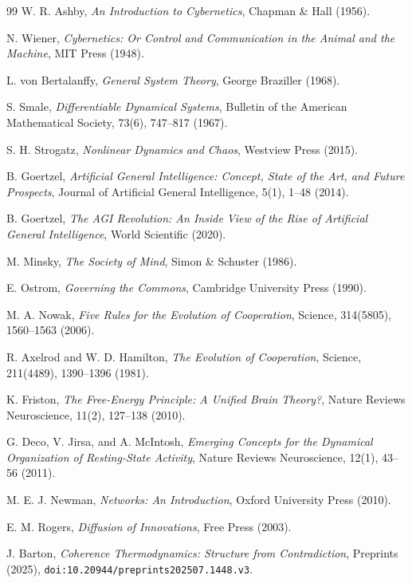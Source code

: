 \documentclass[12pt,a4paper]{article}
\begin{document}
\begin{thebibliography}{99}
W. R. Ashby,
\textit{An Introduction to Cybernetics},
Chapman \& Hall (1956).

N. Wiener,
\textit{Cybernetics: Or Control and Communication in the Animal and the Machine},
MIT Press (1948).

L. von Bertalanffy,
\textit{General System Theory},
George Braziller (1968).

S. Smale,
\textit{Differentiable Dynamical Systems},
Bulletin of the American Mathematical Society, 73(6), 747--817 (1967).

S. H. Strogatz,
\textit{Nonlinear Dynamics and Chaos},
Westview Press (2015).

B. Goertzel,
\textit{Artificial General Intelligence: Concept, State of the Art, and Future Prospects},
Journal of Artificial General Intelligence, 5(1), 1--48 (2014).

B. Goertzel,
\textit{The AGI Revolution: An Inside View of the Rise of Artificial General Intelligence},
World Scientific (2020).

M. Minsky,
\textit{The Society of Mind},
Simon \& Schuster (1986).

E. Ostrom,
\textit{Governing the Commons},
Cambridge University Press (1990).

M. A. Nowak,
\textit{Five Rules for the Evolution of Cooperation},
Science, 314(5805), 1560--1563 (2006).

R. Axelrod and W. D. Hamilton,
\textit{The Evolution of Cooperation},
Science, 211(4489), 1390--1396 (1981).

K. Friston,
\textit{The Free-Energy Principle: A Unified Brain Theory?},
Nature Reviews Neuroscience, 11(2), 127--138 (2010).

G. Deco, V. Jirsa, and A. McIntosh,
\textit{Emerging Concepts for the Dynamical Organization of Resting-State Activity},
Nature Reviews Neuroscience, 12(1), 43--56 (2011).

M. E. J. Newman,
\textit{Networks: An Introduction},
Oxford University Press (2010).

E. M. Rogers,
\textit{Diffusion of Innovations},
Free Press (2003).

J. Barton,
\textit{Coherence Thermodynamics: Structure from Contradiction},
Preprints (2025),
\texttt{doi:10.20944/preprints202507.1448.v3}.

\end{thebibliography}
\end{document}
